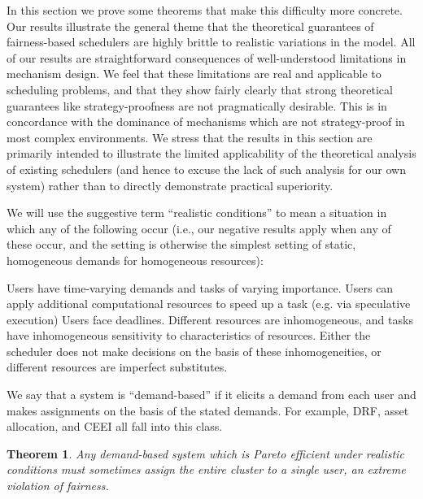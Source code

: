 \documentclass{acm_proc_article-sp}
\newtheorem{theorem}{Theorem}[section]
\begin{document}
In this section we prove some theorems that make this difficulty more concrete. Our results illustrate the general theme that the theoretical guarantees of fairness-based schedulers are highly brittle to realistic variations in the model. All of our results are straightforward consequences of well-understood limitations in mechanism design. We feel that these limitations are real and applicable to scheduling problems, and that they show fairly clearly that strong theoretical guarantees like strategy-proofness are not pragmatically desirable. This is in concordance with the dominance of mechanisms which are not strategy-proof in most complex environments. We stress that the results in this section are primarily intended to illustrate the limited applicability of the theoretical analysis of existing schedulers (and hence to excuse the lack of such analysis for our own system) rather than to directly demonstrate practical superiority.

We will use the suggestive term ``realistic conditions'' to mean a situation in which any of the following occur (i.e., our negative results apply when any of these occur, and the setting is otherwise the simplest setting of static, homogeneous demands for homogeneous resources):

Users have time-varying demands and tasks of varying importance.
Users can apply additional computational resources to speed up a task (e.g. via speculative execution)
Users face deadlines.
Different resources are inhomogeneous, and tasks have inhomogeneous sensitivity to characteristics of resources. Either the scheduler does not make decisions on the basis of these inhomogeneities, or different resources are imperfect substitutes.

We say that a system is ``demand-based'' if it elicits a demand from each user and makes assignments on the basis of the stated demands. For example, DRF, asset allocation, and CEEI all fall into this class.

\begin{theorem}\label{demand-bad}
Any demand-based system which is Pareto efficient under realistic conditions must sometimes assign the entire cluster to a single user, an extreme violation of fairness.
\end{theorem}
\end{document}
